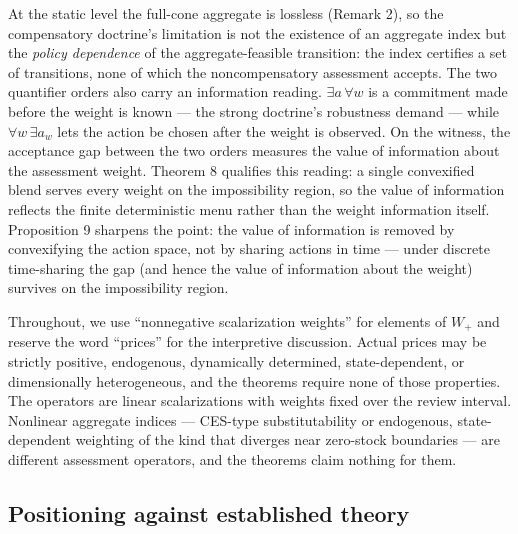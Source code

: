 \documentclass[review,11pt]{elsarticle}
\begin{document}
At the static level the full-cone aggregate is lossless (Remark 2), so the compensatory doctrine's limitation is not the existence of an aggregate index but the \emph{policy dependence} of the aggregate-feasible transition: the index certifies a set of transitions, none of which the noncompensatory assessment accepts. The two
quantifier orders also carry an information reading.
\(\exists a\, \forall w\) is a commitment made before the weight is
known --- the strong doctrine's robustness demand --- while
\(\forall w\, \exists a_w\) lets the action be chosen after the weight
is observed. On the witness, the acceptance gap between the two orders
measures the value of information about the assessment weight. Theorem 8 qualifies this reading: a single convexified blend serves every weight on the impossibility region, so the value of information reflects the finite deterministic menu rather than the weight information itself. Proposition 9 sharpens the point: the value of information is removed by convexifying the action space, not by sharing actions in time --- under discrete time-sharing the gap (and
hence the value of information about the weight) survives on the
impossibility region.

Throughout, we use ``nonnegative scalarization weights'' for elements of
\(W_+\) and reserve the word ``prices'' for the interpretive discussion.
Actual prices may be strictly positive, endogenous,
dynamically determined, state-dependent, or dimensionally heterogeneous,
and the theorems require none of those properties. The operators are
linear scalarizations with weights fixed over the review interval.
Nonlinear aggregate indices --- CES-type substitutability or endogenous,
state-dependent weighting of the kind that diverges near zero-stock
boundaries --- are different assessment operators, and the theorems
claim nothing for them.

\subsection{Positioning against established
theory}\label{positioning-against-established-theory}
\end{document}
